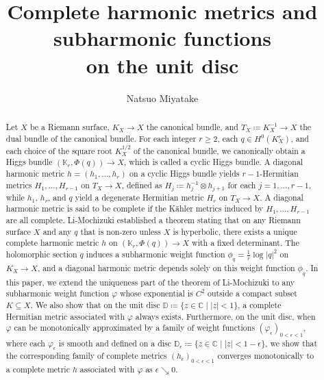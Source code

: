 \documentclass[12pt]{article}
\theoremstyle{definition}
\def\C{{\mathbb C}}
\def\K{{\mathbb K}}
\def\D{{\mathbb D}}
\begin{document}
\title {Complete harmonic metrics and subharmonic functions \\
on the unit disc}
\author {Natsuo Miyatake}
\date{}
\maketitle
\begin{abstract} 
Let $X$ be a Riemann surface, $K_X \rightarrow X$ the canonical bundle, and $T_X\coloneqq K_X^{-1}\rightarrow X$ the dual bundle of the canonical bundle. For each integer $r \geq 2$, each $q \in H^0(K_X^r)$, and each choice of the square root $K_X^{1/2}$ of the canonical bundle, we canonically obtain a Higgs bundle $(\K_r,\Phi(q))\rightarrow X$, which is called a cyclic Higgs bundle. A diagonal harmonic metric $h = (h_1, \dots, h_r)$ on a cyclic Higgs bundle yields $r-1$-Hermitian metrics $H_1, \dots, H_{r-1}$ on $T_X\rightarrow X$, defined as $H_j \coloneqq h_j^{-1} \otimes h_{j+1}$ for each $j=1,\dots, r-1$, while $h_1$, $h_r$, and $q$ yield a degenerate Hermitian metric $H_r$ on $T_X \rightarrow X$. A diagonal harmonic metric is said to be complete if the K\"ahler metrics induced by $H_1,\dots, H_{r-1}$ are all complete. Li-Mochizuki established a theorem stating that on any Riemann surface $X$ and any $q$ that is non-zero unless $X$ is hyperbolic, there exists a unique complete harmonic metric $h$ on $(\K_r,\Phi(q))\rightarrow X$ with a fixed determinant. The holomorphic section $q$ induces a subharmonic weight function $\phi_q=\frac{1}{r}\log|q|^2$ on $K_X\rightarrow X$, and a diagonal harmonic metric depends solely on this weight function $\phi_q$. In this paper, we extend the uniqueness part of the theorem of Li-Mochizuki to any subharmonic weight function $\varphi$ whose exponential is $C^2$ outside a compact subset $K \subseteq X$. 
We also show that on the unit disc $\D \coloneqq \{z \in \C \mid |z| < 1\}$, a complete Hermitian metric associated with $\varphi$ always exists. 
Furthermore, on the unit disc, when $\varphi$ can be monotonically approximated by a family of weight functions $(\varphi_\epsilon)_{0 < \epsilon < 1}$, where each $\varphi_\epsilon$ is smooth and defined on a disc $\D_\epsilon \coloneqq \{z \in \C \mid |z| < 1 - \epsilon\}$, we show that the corresponding family of complete metrics $(h_\epsilon)_{0 < \epsilon < 1}$ converges monotonically to a complete metric $h$ associated with $\varphi$ as $\epsilon\searrow 0$.

\end{abstract}
\end{document}
